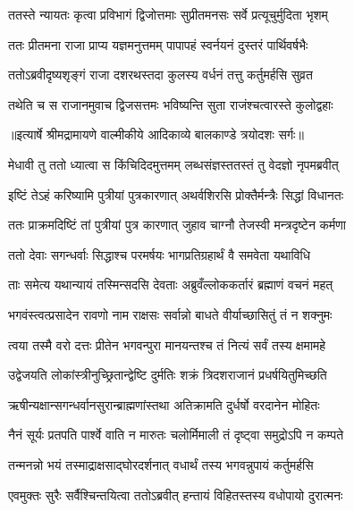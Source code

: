 \twolineshloka
{ततस्ते न्यायतः कृत्वा प्रविभागं द्विजोत्तमाः}
{सुप्रीतमनसः सर्वे प्रत्यूचुर्मुदिता भृशम्} %

\twolineshloka
{ततः प्रीतमना राजा प्राप्य यज्ञमनुत्तमम्}
{पापापहं स्वर्नयनं दुस्तरं पार्थिवर्षभैः} %

\twolineshloka
{ततोऽब्रवीदृष्यशृङ्गं राजा दशरथस्तदा}
{कुलस्य वर्धनं तत्तु कर्तुमर्हसि सुव्रत} %

\twolineshloka
{तथेति च स राजानमुवाच द्विजसत्तमः}
{भविष्यन्ति सुता राजंश्चत्वारस्ते कुलोद्वहाः} %


{॥इत्यार्षे श्रीमद्रामायणे वाल्मीकीये आदिकाव्ये बालकाण्डे त्रयोदशः सर्गः॥}


\twolineshloka
{मेधावी तु ततो ध्यात्वा स किंचिदिदमुत्तमम्}
{लब्धसंज्ञस्ततस्तं तु वेदज्ञो नृपमब्रवीत्} %

\twolineshloka
{इष्टिं तेऽहं करिष्यामि पुत्रीयां पुत्रकारणात्}
{अथर्वशिरसि प्रोक्तैर्मन्त्रैः सिद्धां विधानतः} %

\twolineshloka
{ततः प्राक्रमदिष्टिं तां पुत्रीयां पुत्र कारणात्}
{जुहाव चाग्नौ तेजस्वी मन्त्रदृष्टेन कर्मणा} %

\twolineshloka
{ततो देवाः सगन्धर्वाः सिद्धाश्च परमर्षयः}
{भागप्रतिग्रहार्थं वै समवेता यथाविधि} %

\twolineshloka
{ताः समेत्य यथान्यायं तस्मिन्सदसि देवताः}
{अब्रुवँल्लोककर्तारं ब्रह्माणं वचनं महत्} %

\twolineshloka
{भगवंस्त्वत्प्रसादेन रावणो नाम राक्षसः}
{सर्वान्नो बाधते वीर्याच्छासितुं तं न शक्नुमः} %

\twolineshloka
{त्वया तस्मै वरो दत्तः प्रीतेन भगवन्पुरा}
{मानयन्तश्च तं नित्यं सर्वं तस्य क्षमामहे} %

\twolineshloka
{उद्वेजयति लोकांस्त्रीनुच्छ्रितान्द्वेष्टि दुर्मतिः}
{शक्रं त्रिदशराजानं प्रधर्षयितुमिच्छति} %

\twolineshloka
{ऋषीन्यक्षान्सगन्धर्वानसुरान्ब्राह्मणांस्तथा}
{अतिक्रामति दुर्धर्षो वरदानेन मोहितः} %

\twolineshloka
{नैनं सूर्यः प्रतपति पार्श्वे वाति न मारुतः}
{चलोर्मिमाली तं दृष्ट्वा समुद्रोऽपि न कम्पते} %

\twolineshloka
{तन्मनन्नो भयं तस्माद्राक्षसाद्घोरदर्शनात्}
{वधार्थं तस्य भगवन्नुपायं कर्तुमर्हसि} %

\twolineshloka
{एवमुक्तः सुरैः सर्वैश्चिन्तयित्वा ततोऽब्रवीत्}
{हन्तायं विहितस्तस्य वधोपायो दुरात्मनः} %

